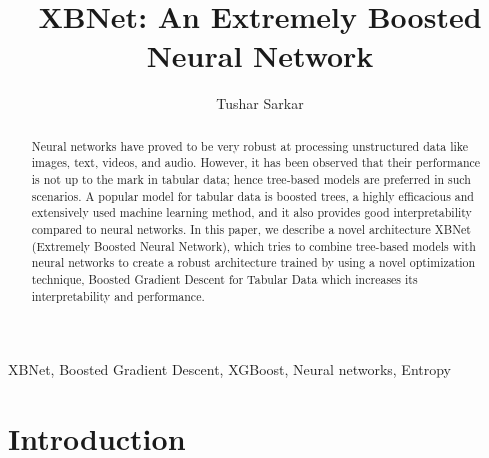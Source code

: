 \documentclass[review]{elsarticle}
\begin{document}
\begin{frontmatter}

\title{XBNet: An Extremely Boosted Neural Network}


\author{Tushar Sarkar}
\address{Analytica, Mumbai }



\begin{abstract}
Neural networks have proved to be very robust at processing unstructured data like images, text, videos, and audio. However, it has been observed that their performance is not up to the mark in tabular data; hence tree-based models are preferred in such scenarios. A popular model for tabular data is boosted trees, a highly efficacious and extensively used machine learning method, and it also provides good interpretability compared to neural networks. In this paper, we describe a novel architecture XBNet (Extremely Boosted Neural Network), which tries to combine tree-based models with neural networks to create a robust architecture trained by using a novel optimization technique, Boosted Gradient Descent for Tabular Data which increases its interpretability and performance.
\end{abstract}

\begin{keyword}
XBNet, Boosted Gradient Descent, XGBoost, Neural networks, Entropy
\end{keyword}

\end{frontmatter}


\section{Introduction}
\end{document}
